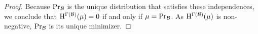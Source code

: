 \documentclass{article}
\numberwithin{equation}{section}
\begin{document}
\begin{proof}
		Because $\Pr_{\cal B}$ is the unique distribution that satisfies these independences, we conclude that $\mathrm{H}^{\Gamma(\cal B)}(\mu) = 0$ if and only if $\mu = \Pr_{\cal B}$. 	
		As $\mathrm{H}^{\Gamma(\cal B)}(\mu)$ is non-negative, $\Pr_{\cal B}$ is its unique minimizer. 
		
		
	\end{proof}
\end{document}
